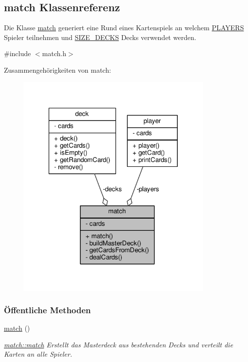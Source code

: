 \hypertarget{classmatch}{\subsection{match Klassenreferenz}
\label{classmatch}
}


Die Klasse \hyperlink{classmatch}{match} generiert eine Rund eines Kartenspiels an welchem \hyperlink{match_8h_a35874ee321ab82a60db7957e8fd6c61c}{P\-L\-A\-Y\-E\-R\-S} Spieler teilnehmen und \hyperlink{match_8h_a63cfbde7ca4628196a360676e43d810a}{S\-I\-Z\-E\-\_\-\-D\-E\-C\-K\-S} Decks verwendet werden.  




{\ttfamily \#include $<$match.\-h$>$}



Zusammengehörigkeiten von match\-:\nopagebreak
\begin{figure}[H]
\begin{center}
\leavevmode
\includegraphics[width=277pt]{d6/d2b/classmatch__coll__graph}
\end{center}
\end{figure}
\subsubsection*{Öffentliche Methoden}
\begin{DoxyCompactItemize}
\item 
\hyperlink{classmatch_a324c10417644283bb7101859392ed252}{match} ()
\begin{DoxyCompactList}\small\item\em \hyperlink{classmatch_a324c10417644283bb7101859392ed252}{match\-::match} Erstellt das Masterdeck aus bestehenden Decks und verteilt die Karten an alle Spieler. \end{DoxyCompactList}\end{DoxyCompactItemize}
